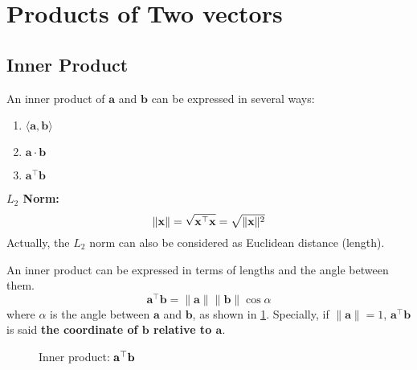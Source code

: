 \section{Products of Two vectors}
\subsection{Inner Product}
An inner product of $\mathbf{a}$ and $\mathbf{b}$  can be expressed in several ways:

\begin{enumerate}
    \item $\langle \mathbf{a}, \mathbf{b} \rangle$
    \item $\mathbf{a}\cdot \mathbf{b}$
    \item $\mathbf{a}^{\top}\mathbf{b}$
\end{enumerate}

\begin{Def}
    \textbf{$L_2$ Norm:}
    \begin{equation}
        \lVert \mathbf{x} \rVert = \sqrt{\mathbf{x}^{\top}\mathbf{x}} = \sqrt{\lVert \mathbf{x} \rVert^2}
    \end{equation}
    Actually, the $L_2$ norm can also be considered as Euclidean distance (length).
\end{Def}
An inner product can be expressed in terms of lengths and the angle between them.
\begin{equation}
    \mathbf{a}^\top \mathbf{b} = \lVert \mathbf{a} \rVert \lVert \mathbf{b} \rVert \cos \alpha 
\end{equation}
where $\alpha$ is the angle between $\mathbf{a}$ and $\mathbf{b}$, as shown in \cref{fig:inner-product}. Specially, if $\lVert \mathbf{a} \rVert = 1$, $\mathbf{a}^{\top}\mathbf{b}$ is said \textbf{the coordinate of $\mathbf{b}$ relative to $\mathbf{a}$}.
\begin{figure}
    \centering
    
    \caption{Inner product: $\mathbf{a}^{\top}\mathbf{b}$}
    \label{fig:inner-product}
\end{figure}

